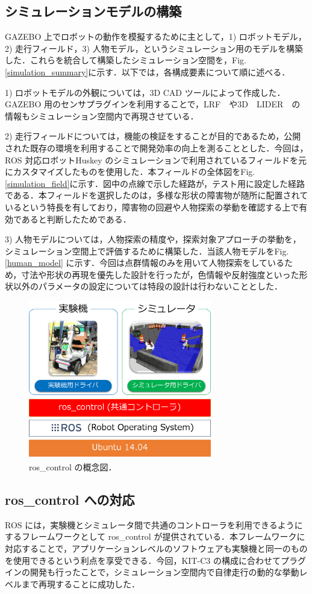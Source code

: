 \documentclass[10pt,a4paper]{jarticle}
\begin{document}
\subsection{シミュレーションモデルの構築}
\label{subsec:simulationmodel}
GAZEBO 上でロボットの動作を模擬するために主として，1) ロボットモデル，2) 走行フィールド，3) 人物モデル，というシミュレーション用のモデルを構築した．これらを統合して構築したシミュレーション空間を，Fig.\ref{simulation_summary}に示す．以下では，各構成要素について順に述べる．

1) ロボットモデルの外観については，3D CAD ツールによって作成した．GAZEBO 用のセンサプラグインを利用することで，LRF　や3D　LIDER　の情報もシミュレーション空間内で再現させている．

2) 走行フィールドについては，機能の検証をすることが目的であるため，公開された既存の環境を利用することで開発効率の向上を測ることとした．今回は，ROS 対応ロボットHuskey \cite{husky} のシミュレーションで利用されているフィールドを元にカスタマイズしたものを使用した．本フィールドの全体図をFig.\ref{simulation_field}に示す．図中の点線で示した経路が，テスト用に設定した経路である．本フィールドを選択したのは，多様な形状の障害物が随所に配置されているという特長を有しており，障害物の回避や人物探索の挙動を確認する上で有効であると判断したためである．

3) 人物モデルについては，人物探索の精度や，探索対象アプローチの挙動を，シミュレーション空間上で評価するために構築した．当該人物モデルをFig. \ref{human_model} に示す．今回は点群情報のみを用いて人物探索をしているため，寸法や形状の再現を優先した設計を行ったが，色情報や反射強度といった形状以外のパラメータの設定については特段の設計は行わないこととした．

\begin{figure}[ht]
    \centering
    \includegraphics[width=8cm]{./fig/png/ros_control.png}
    \caption{ros\_control の概念図．}
    \label{ros_control}
\end{figure}

\subsection{ros\_control への対応}
\label{subsec:ros_control}
ROS には，実験機とシミュレータ間で共通のコントローラを利用できるようにするフレームワークとして ros\_control \cite{ros_control_wiki} が提供されている．本フレームワークに対応することで，アプリケーションレベルのソフトウェアも実験機と同一のものを使用できるという利点を享受できる．今回，KIT-C3 の構成に合わせてプラグインの開発も行ったことで，シミュレーション空間内で自律走行の動的な挙動レベルまで再現することに成功した．
\end{document}
